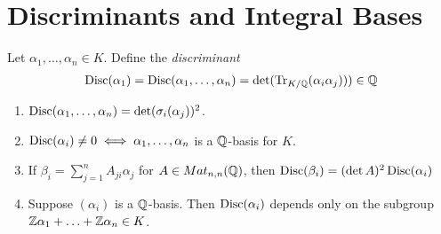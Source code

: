 \documentclass[10pt,a4paper]{article}
\begin{document}
\section{Discriminants and Integral Bases}
Let $\alpha_1, \ldots, \alpha_n \in K$. Define the \emph{discriminant}
\begin{align*}
\operatorname{Disc}(\alpha_1) = \operatorname{Disc}(\alpha_1, \ldots, \alpha_n) = \det(\operatorname{Tr}_{K/\mathbb{Q}}(\alpha_i\alpha_j))) \in \mathbb{Q}
\end{align*}
\begin{theorem}
\item
\begin{enumerate}
\item $\operatorname{Disc}(\alpha_1, \ldots, \alpha_n) = \det(\sigma_i(\alpha_j))^2$.
\item $\operatorname{Disc}(\alpha_i) \neq 0  \iff \alpha_1, \ldots, \alpha_n$ is a $\mathbb{Q}$-basis for $K$.
\item If $\beta_i = \sum_{j=1}^n A_{ji}\alpha_j$ for $A \in Mat_{n,n}(\mathbb{Q})$, then $\operatorname{Disc}(\beta_i) = (\det A)^2\operatorname{Disc}(\alpha_i)$
\item Suppose $(\alpha_i)$ is a $\mathbb{Q}$-basis. Then $\operatorname{Disc}(\alpha_i)$ depends only on the subgroup $\mathbb{Z}\alpha_1+\ldots+\mathbb{Z}\alpha_n \in K$.
\end{enumerate}
\end{theorem}
\end{document}
